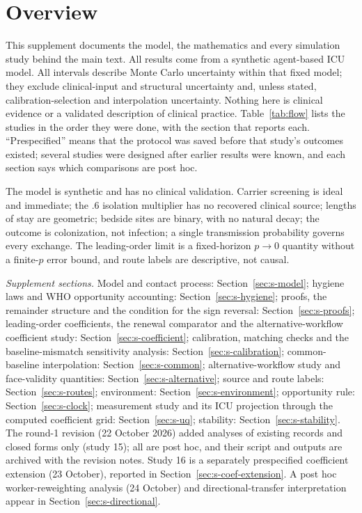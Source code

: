 \section*{Overview}
This supplement documents the model, the mathematics and every simulation study
behind the main text. All results come from a synthetic agent-based ICU model.
All intervals describe Monte Carlo uncertainty within that fixed model; they
exclude clinical-input and structural uncertainty and, unless stated,
calibration-selection and interpolation uncertainty. Nothing here is clinical
evidence or a validated description of clinical practice.
Table~\ref{tab:flow} lists the studies in the order they were done, with the
section that reports each. ``Prespecified'' means that the protocol was saved
before that study's outcomes existed; several studies were designed after
earlier results were known, and each section says which comparisons are post
hoc.

The model is synthetic and has no clinical
validation. Carrier screening is ideal and immediate; the .6 isolation
multiplier has no recovered clinical source; lengths of stay are geometric;
bedside sites are binary, with no natural decay; the outcome is colonization,
not infection; a single transmission probability governs every exchange. The
leading-order limit is a fixed-horizon $p\to0$ quantity without a finite-$p$
error bound, and route labels are descriptive, not causal.

\emph{Supplement sections.} Model and contact process:
Section~\ref{sec:s-model}; hygiene laws and WHO opportunity accounting:
Section~\ref{sec:s-hygiene}; proofs, the remainder structure and the condition for
the sign reversal: Section~\ref{sec:s-proofs}; leading-order coefficients, the
renewal comparator and the alternative-workflow coefficient study:
Section~\ref{sec:s-coefficient}; calibration, matching checks and the
baseline-mismatch sensitivity analysis: Section~\ref{sec:s-calibration}; common-baseline
interpolation: Section~\ref{sec:s-common}; alternative-workflow study and
face-validity quantities: Section~\ref{sec:s-alternative}; source and route labels:
Section~\ref{sec:s-routes}; environment: Section~\ref{sec:s-environment}; opportunity
rule: Section~\ref{sec:s-clock}; measurement study and its ICU projection
through the computed coefficient grid: Section~\ref{sec:s-uq}; stability: Section~\ref{sec:s-stability}. The
round-1 revision (22 October 2026) added analyses of existing records and closed
forms only (study 15); all are post hoc, and their script and outputs are archived
with the revision notes. Study 16 is a separately prespecified coefficient
extension (23 October), reported in Section~\ref{sec:s-coef-extension}. A post hoc
worker-reweighting analysis (24 October) and directional-transfer interpretation
appear in Section~\ref{sec:s-directional}.

